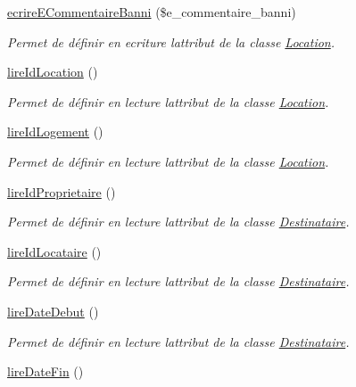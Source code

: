 \begin{DoxyCompactItemize}
\hyperlink{class_location_a1513da105184708fa8877db4b3e6cd70}{ecrire\+E\+Commentaire\+Banni} (\$e\+\_\+commentaire\+\_\+banni)
\begin{DoxyCompactList}\small\item\em Permet de définir en ecriture l\textquotesingle{}attribut de la classe \hyperlink{class_location}{Location}. \end{DoxyCompactList}\item 
\hyperlink{class_location_acd888ff7d6a8a9ecea9095d3043c0269}{lire\+Id\+Location} ()
\begin{DoxyCompactList}\small\item\em Permet de définir en lecture l\textquotesingle{}attribut de la classe \hyperlink{class_location}{Location}. \end{DoxyCompactList}\item 
\hyperlink{class_location_aefef9a6a5d9d8873da317f860245a761}{lire\+Id\+Logement} ()
\begin{DoxyCompactList}\small\item\em Permet de définir en lecture l\textquotesingle{}attribut de la classe \hyperlink{class_location}{Location}. \end{DoxyCompactList}\item 
\hyperlink{class_location_abf635ae33c10e78ad1471fc72d4520ec}{lire\+Id\+Proprietaire} ()
\begin{DoxyCompactList}\small\item\em Permet de définir en lecture l\textquotesingle{}attribut de la classe \hyperlink{class_destinataire}{Destinataire}. \end{DoxyCompactList}\item 
\hyperlink{class_location_a6854f6372729493f388ce39b52316c02}{lire\+Id\+Locataire} ()
\begin{DoxyCompactList}\small\item\em Permet de définir en lecture l\textquotesingle{}attribut de la classe \hyperlink{class_destinataire}{Destinataire}. \end{DoxyCompactList}\item 
\hyperlink{class_location_a1ff21d7c6496b9a01767a2a2fc9847e4}{lire\+Date\+Debut} ()
\begin{DoxyCompactList}\small\item\em Permet de définir en lecture l\textquotesingle{}attribut de la classe \hyperlink{class_destinataire}{Destinataire}. \end{DoxyCompactList}\item 
\hyperlink{class_location_a6ca6f5b4b4b49d0f27b46a7fff3a476c}{lire\+Date\+Fin} ()

\end{DoxyCompactItemize}
